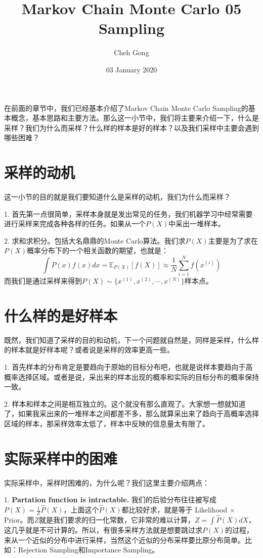 \documentclass[a4paper]{article}
\title{Markov Chain Monte Carlo 05 Sampling}
\author{Cheh Gong}
\date{03 January 2020}
\begin{document}
\maketitle
在前面的章节中，我们已经基本介绍了Markov Chain Monte Carlo Sampling的基本概念，基本思路和主要方法。那么这一小节中，我们将主要来介绍一下，什么是采样？我们为什么而采样？什么样的样本是好的样本？以及我们采样中主要会遇到哪些困难？
\section{采样的动机}
这一小节的目的就是我们要知道什么是采样的动机，我们为什么而采样？

1. 首先第一点很简单，采样本身就是发出常见的任务，我们机器学习中经常需要进行采样来完成各种各样的任务。如果从一个$P(X)$中采出一堆样本。

2. 求和求积分。包括大名鼎鼎的Monte Carlo算法。我们求$P(X)$主要是为了求在$P(X)$概率分布下的一个相关函数的期望，也就是：
\begin{equation}
    \int P(x)f(x)dx = \mathbb{E}_{P(X)}[f(X)] \approx \frac{1}{N} \sum_{i=1}^N f(x^{(i)})
\end{equation}
而我们是通过采样来得到$P(X) \sim \{ x^{(1)},x^{(2)},\cdots, x^{(N)} \}$样本点。

\section{什么样的是好样本}
既然，我们知道了采样的目的和动机，下一个问题就自然是，同样是采样，什么样的样本就是好样本呢？或者说是采样的效率更高一些。

1. 首先样本的分布肯定是要趋向于原始的目标分布吧，也就是说样本要趋向于高概率选择区域。或者是说，采出来的样本出现的概率和实际的目标分布的概率保持一致。

2. 样本和样本之间是相互独立的。这个就没有那么直观了。大家想一想就知道了，如果我采出来的一堆样本之间都差不多，那么就算采出来了趋向于高概率选择区域的样本，那采样效率太低了，样本中反映的信息量太有限了。

\section{实际采样中的困难}
实际采样中，采样时困难的，为什么呢？我们这里主要介绍两点：

1. \textbf{Partation function is intractable.} 我们的后验分布往往被写成$P(X) = \frac{1}{Z} \hat{P}(X)$，上面这个$\hat{P}(X)$都比较好求，就是等于 Likelihood $\times$ Prior。而$Z$就是我们要求的归一化常数，它非常的难以计算，$Z = \int \hat{P}(X) dX$，这几乎就是不可计算的。所以，有很多采样方法就是想要跳过求$P(X)$的过程，来从一个近似的分布中进行采样，当然这个近似的分布采样要比原分布简单。比如：Rejection Sampling和Importance Sampling。
\end{document}
